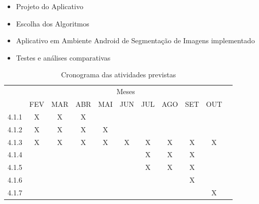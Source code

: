 \begin{itemize}
\item Projeto do  Aplicativo
\item Escolha dos Algoritmos 
\item Aplicativo em Ambiente Android de Segmentação de Imagens implementado
\item Testes e análises comparativas
\end{itemize}


\begin{table}[!htpb]
\centering

\begin{small} 
  
\setlength{\tabcolsep}{3pt} 


\begin{tabular}{|c|c|c|c|c|c|c|c|c|c|c|}\hline
 & \multicolumn{9}{c|}{Meses}\\ \cline{2-10}
\raisebox{1.5ex}{Etapa} & FEV & MAR & ABR & MAI & JUN & JUL & AGO & SET & OUT \\ \hline

4.1.1 & X & X & X & & & & & &   \\ \hline
4.1.2 & X & X & X & X & & & & &   \\ \hline
4.1.3 & X & X & X & X & X & X & X & X & X    \\ \hline
4.1.4 & &  &  & &  & X & X & X &  \\ \hline
4.1.5 & &  &  & &  & X & X & X &    \\ \hline
4.1.6 & & & & & & & & X &   \\ \hline
4.1.7 & & & & & & & & & X  \\ \hline

\end{tabular} 
\end{small}
\caption{Cronograma das atividades previstas}
\label{t_cronograma}
\end{table} 

